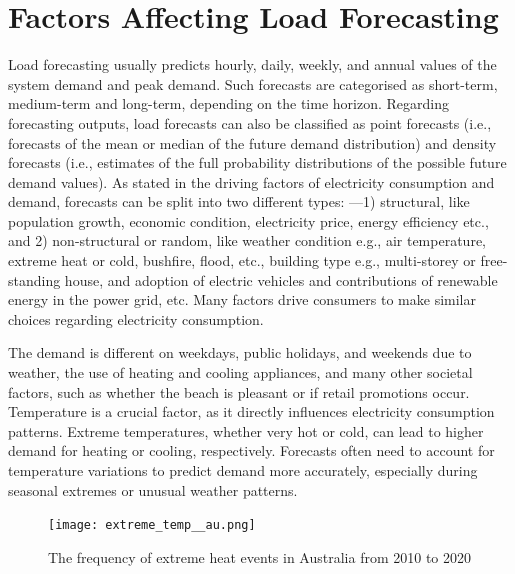 \documentclass[mstat,12pt]{unswthesis}
\begin{document}
\hypertarget{factors-affecting-load-forecasting}{%
\section{Factors Affecting Load
Forecasting}\label{factors-affecting-load-forecasting}}

Load forecasting usually predicts hourly, daily, weekly, and annual
values of the system demand and peak demand. Such forecasts are
categorised as short-term, medium-term and long-term, depending on the
time horizon. Regarding forecasting outputs, load forecasts can also be
classified as point forecasts (i.e., forecasts of the mean or median of
the future demand distribution) and density forecasts (i.e., estimates
of the full probability distributions of the possible future demand
values). As stated in \cite{nsw_epa_2021_energy_consumption} the driving
factors of electricity consumption and demand, forecasts can be split
into two different types: ---1) structural, like population growth,
economic condition, electricity price, energy efficiency etc., and 2)
non-structural or random, like weather condition e.g., air temperature,
extreme heat or cold, bushfire, flood, etc., building type e.g.,
multi-storey or free-standing house, and adoption of electric vehicles
and contributions of renewable energy in the power grid, etc. Many
factors drive consumers to make similar choices regarding electricity
consumption.

The demand is different on weekdays, public holidays, and weekends due
to weather, the use of heating and cooling appliances, and many other
societal factors, such as whether the beach is pleasant or if retail
promotions occur. Temperature is a crucial factor, as it directly
influences electricity consumption patterns. Extreme temperatures,
whether very hot or cold, can lead to higher demand for heating or
cooling, respectively. Forecasts often need to account for temperature
variations to predict demand more accurately, especially during seasonal
extremes or unusual weather patterns.

\begin{figure}[H]
\centering
\texttt{[image: extreme\_temp\_\_au.png]}
\caption{The frequency of extreme heat events in Australia from 2010 to 2020}\label{extreme}
\end{figure}
\end{document}
